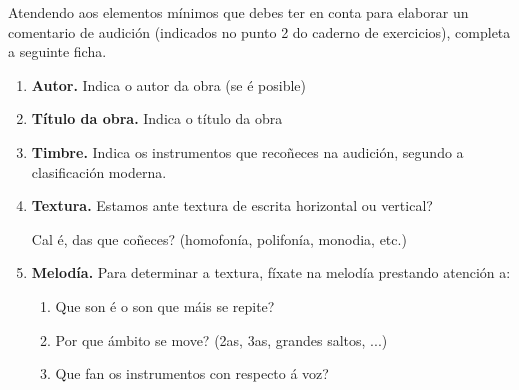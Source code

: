 

%
\begin{ejercicio}
%
Atendendo aos elementos mínimos que debes ter en conta para elaborar un comentario de audición (indicados no punto 2 do caderno de exercicios), completa a seguinte ficha.
%
    \begin{enumerate}[1.-]
    \item \textbf{Autor.} Indica o autor da obra (se é posible) \dotfill
    \item \textbf{Título da obra.} Indica o título da obra \dotfill
        \item 
        \textbf{Timbre.}
        Indica os instrumentos que recoñeces na audición, segundo a clasificación moderna.
        \vspace*{1.0cm}
%
        \item
        \textbf{Textura.}
        Estamos ante textura de escrita horizontal ou vertical? \dotfill
        \par
        Cal é, das que coñeces? (homofonía, polifonía, monodia, etc.) \dotfill \par
%
        \item
        \textbf{Melodía.}
            Para determinar a textura, fíxate na melodía prestando atención a:
            \begin{enumerate}
            \item Que son é o son que máis se repite? \dotfill
            \item Por que ámbito se move? (2as, 3as, grandes saltos, ...) \dotfill
            \item Que fan os instrumentos con respecto á voz? \dotfill

\end{enumerate}
\end{enumerate}
\end{ejercicio}
